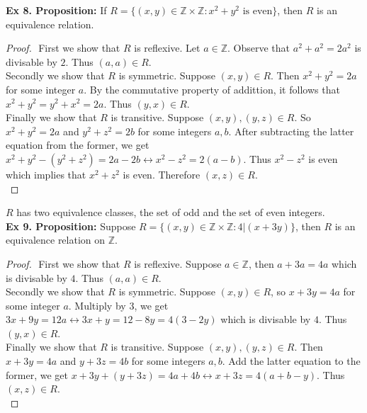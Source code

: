 \documentclass{article}
\begin{document}
\newpage
\noindent \textbf{Ex 8. Proposition:} If $R=\{(x, y) \in \mathbb{Z}\times\mathbb{Z} : x^2 + y^2 \text{ is even}\}$, then $R$ is an equivalence relation.\\
\begin{proof}
$ $\newline
First we show that $R$ is reflexive. Let $a \in \mathbb{Z}$. Observe that $a^2+a^2=2a^2$ is divisable by $2$. Thus $(a,a) \in R$.\\

\noindent Secondly we show that $R$ is symmetric. Suppose $(x, y) \in R$. Then $x^2+y^2=2a$ for some integer $a$. By the commutative property of addittion, it follows that $x^2+y^2=y^2+x^2=2a$. Thus $(y, x) \in R$.\\

\noindent Finally we show that $R$ is transitive. Suppose $(x, y), (y,z) \in R$. So $x^2+y^2=2a$ and $y^2+z^2=2b$ for some integers $a, b$. After subtracting the latter equation from the former, we get $x^2+y^2-(y^2+z^2)=2a-2b \leftrightarrow x^2-z^2=2(a-b)$. Thus $x^2-z^2$ is even which implies that $x^2+z^2$ is even. Therefore $(x, z) \in R$.\\
\end{proof}
\noindent $R$ has two equivalence classes, the set of odd and the set of even integers.\\

\noindent \textbf{Ex 9. Proposition:} Suppose $R=\{ (x, y) \in \mathbb{Z} \times \mathbb{Z} : 4|(x+3y) \}$, then $R$ is an equivalence relation on $\mathbb{Z}$.
\begin{proof}
$ $\newline
\noindent First we show that $R$ is reflexive. Suppose $a \in \mathbb{Z}$, then $a+3a=4a$ which is divisable by $4$. Thus $(a,a) \in R$.\\

\noindent Secondly we show that $R$ is symmetric. Suppose $(x, y) \in R$, so $x+3y=4a$ for some integer $a$. Multiply by $3$, we get $3x+9y=12a \leftrightarrow 3x+y=12-8y=4(3-2y)$ which is divisable by $4$. Thus $(y,x) \in R$.\\

\noindent Finally we show that $R$ is transitive. Suppose $(x, y), (y,z) \in R$. Then $x+3y=4a$ and $y+3z=4b$ for some integers $a, b$. Add the latter equation to the former, we get $x+3y+(y+3z)=4a+4b \leftrightarrow x+3z=4(a+b-y)$. Thus $(x,z) \in R$.\\
\end{proof}
\end{document}

